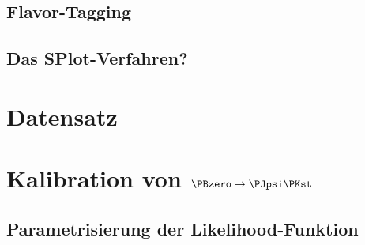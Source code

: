 \subsection{Flavor-Tagging}


\subsection{Das SPlot-Verfahren?}

\section{Datensatz}

\section{\texorpdfstring{Kalibration von $\PBzero \to \PJpsi \PKst$}{Kalibration von B0 -> JpsiKst}}


\subsection{Parametrisierung der Likelihood-Funktion}



